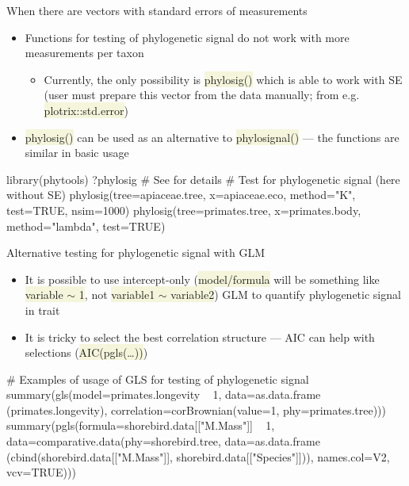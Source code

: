 \documentclass[compress, ucs, xelatex, 11pt, xcolor=svgnames, aspectratio=169,
	hyperref={
		bookmarks=true,
		unicode=true,
		colorlinks=true,
		pdftitle={Molecular data in R},
		plainpages=false,
		pdfauthor={Vojtech Zeisek},
		pdfsubject={Course about phylogeny and evolution in R},
		pdfcreator={XeLaTeX},
		pdfkeywords={R, evolution, phylogeny, molecular data},
		linkcolor=Crimson, %
		anchorcolor=Magenta, %
		citecolor=Magenta, %
		filecolor=Magenta, %
		menucolor=Magenta, %
		urlcolor=DodgerBlue, %
		pdftex},
	url={hyphens, lowtilde} %
	]{beamer}
\renewcommand{\texttt}[1]{\colorbox{Beige}{{\ttfamily #1}}}
\begin{document}
\begin{frame}[fragile]{When there are vectors with standard errors of measurements}
	\begin{itemize}
		\item Functions for testing of phylogenetic signal do not work with more measurements per taxon
		\begin{itemize}
			\item Currently, the only possibility is \texttt{phylosig()} which is able to work with SE (user must prepare this vector from the data manually; from e.g. \texttt{plotrix::std.error})
		\end{itemize}
		\item \texttt{phylosig()} can be used as an alternative to \texttt{phylosignal()} --- the functions are similar in basic usage
	\end{itemize}
	\begin{spluscode}
    library(phytools)
    ?phylosig # See for details
    # Test for phylogenetic signal (here without SE)
    phylosig(tree=apiaceae.tree, x=apiaceae.eco, method="K", test=TRUE,
      nsim=1000)
    phylosig(tree=primates.tree, x=primates.body, method="lambda",
      test=TRUE)
	\end{spluscode}
\end{frame}

\begin{frame}[fragile]{Alternative testing for phylogenetic signal with GLM}
	\begin{itemize}
		\item It is possible to use intercept-only (\texttt{model/formula} will be something like \texttt{variable $\sim$ 1}, not \texttt{variable1 $\sim$ variable2}) GLM to quantify phylogenetic signal in trait
		\item It is tricky to select the best correlation structure --- AIC can help with selections (\texttt{AIC(pgls(\ldots))})
	\end{itemize}
	\begin{spluscode}
    # Examples of usage of GLS for testing of phylogenetic signal
    summary(gls(model=primates.longevity ~ 1, data=as.data.frame
      (primates.longevity), correlation=corBrownian(value=1,
      phy=primates.tree)))
    summary(pgls(formula=shorebird.data[["M.Mass"]] ~ 1,
      data=comparative.data(phy=shorebird.tree, data=as.data.frame
      (cbind(shorebird.data[["M.Mass"]], shorebird.data[["Species"]])),
      names.col=V2, vcv=TRUE)))
	\end{spluscode}
\end{frame}
\end{document}
